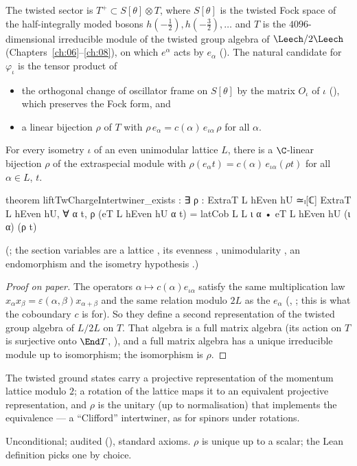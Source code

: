 The twisted sector is $T^+\subset S[\theta]\otimes T$, where $S[\theta]$ is the twisted Fock space of the
half-integrally moded bosons $h(-\tfrac12),h(-\tfrac32),\dots$ and $T$ is the $4096$-dimensional irreducible module of the
twisted group algebra of $\Leech/2\Leech$ (Chapters~\ref{ch:06}--\ref{ch:08}), on which $e^\alpha$ acts by
$e_\alpha$ ().  The natural candidate for $\varphi_\iota$ is the tensor product of
\begin{itemize}
\item the orthogonal change of oscillator frame on $S[\theta]$ by the matrix $O_\iota$ of $\iota$
  (), which preserves the Fock form, and
\item a linear bijection $\rho$ of $T$ with $\rho\,e_\alpha=c(\alpha)\,e_{\iota\alpha}\,\rho$ for all $\alpha$.
\end{itemize}

\begin{theorem}\label{ch22:thm:rho}
For every isometry $\iota$ of an even unimodular lattice $L$, there is a $\C$-linear bijection $\rho$
of the extraspecial module with $\rho(e_\alpha t)=c(\alpha)\,e_{\iota\alpha}(\rho t)$ for all $\alpha\in L$, $t$.
\end{theorem}
\begin{leancode}
theorem liftTwChargeIntertwiner_exists :
    ∃ ρ : ExtraT L hEven hU ≃ₗ[ℂ] ExtraT L hEven hU,
      ∀ α t, ρ (eT L hEven hU α t) =
        latCob L L ι α • eT L hEven hU (ι α) (ρ t)
\end{leancode}
(; the section variables are a lattice , its evenness
, unimodularity , an endomorphism  and the isometry hypothesis
.)
\begin{proof}[Proof on paper]
The operators $\alpha\mapsto c(\alpha)e_{\iota\alpha}$ satisfy the same multiplication law
$x_\alpha x_\beta=\varepsilon(\alpha,\beta)x_{\alpha+\beta}$ and the same relation modulo $2L$ as the $e_\alpha$
(, ; this is what the coboundary $c$ is for).  So they define a
second representation of the twisted group algebra of $L/2L$ on $T$.  That algebra is a full matrix algebra (its action
on $T$ is surjective onto $\End T$, ), and a full matrix algebra has a unique
irreducible module up to isomorphism; the isomorphism is $\rho$.
\end{proof}
\begin{physics}
The twisted ground states carry a projective representation of the momentum lattice modulo $2$; a rotation of the
lattice maps it to an equivalent projective representation, and $\rho$ is the unitary (up to normalisation) that
implements the equivalence --- a ``Clifford'' intertwiner, as for spinors under rotations.
\end{physics}
\begin{status}Unconditional; audited (), standard axioms.  $\rho$
is unique up to a scalar; the Lean definition  picks one by choice.\end{status}

